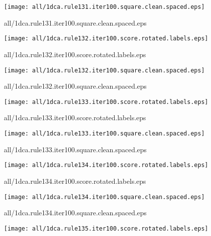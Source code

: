 \documentclass{article}
\begin{document}
\begin{center}
\begin{minipage}{\textwidth}
\texttt{[image: all/1dca.rule131.iter100.square.clean.spaced.eps]}
\end{minipage}
\end{center}
{\footnotesize all/1dca.rule131.iter100.square.clean.spaced.eps}
\begin{center}
\begin{minipage}{\textwidth}
\texttt{[image: all/1dca.rule132.iter100.score.rotated.labels.eps]}
\end{minipage}
\end{center}
{\footnotesize all/1dca.rule132.iter100.score.rotated.labels.eps}
\begin{center}
\begin{minipage}{\textwidth}
\texttt{[image: all/1dca.rule132.iter100.square.clean.spaced.eps]}
\end{minipage}
\end{center}
{\footnotesize all/1dca.rule132.iter100.square.clean.spaced.eps}
\begin{center}
\begin{minipage}{\textwidth}
\texttt{[image: all/1dca.rule133.iter100.score.rotated.labels.eps]}
\end{minipage}
\end{center}
{\footnotesize all/1dca.rule133.iter100.score.rotated.labels.eps}
\begin{center}
\begin{minipage}{\textwidth}
\texttt{[image: all/1dca.rule133.iter100.square.clean.spaced.eps]}
\end{minipage}
\end{center}
{\footnotesize all/1dca.rule133.iter100.square.clean.spaced.eps}
\begin{center}
\begin{minipage}{\textwidth}
\texttt{[image: all/1dca.rule134.iter100.score.rotated.labels.eps]}
\end{minipage}
\end{center}
{\footnotesize all/1dca.rule134.iter100.score.rotated.labels.eps}
\begin{center}
\begin{minipage}{\textwidth}
\texttt{[image: all/1dca.rule134.iter100.square.clean.spaced.eps]}
\end{minipage}
\end{center}
{\footnotesize all/1dca.rule134.iter100.square.clean.spaced.eps}
\begin{center}
\begin{minipage}{\textwidth}
\texttt{[image: all/1dca.rule135.iter100.score.rotated.labels.eps]}
\end{minipage}
\end{center}
\end{document}
